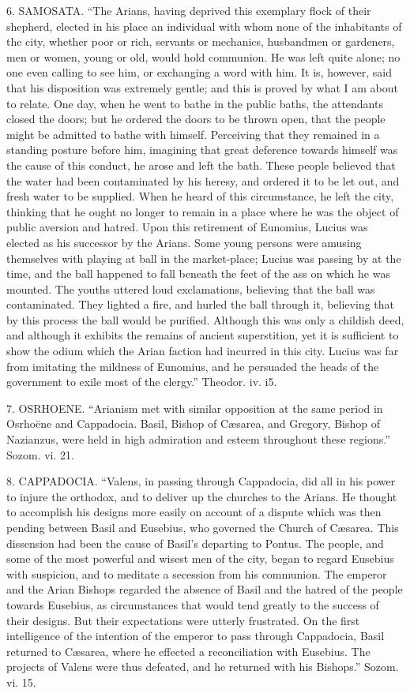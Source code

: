 6. SAMOSATA. ``The Arians, having
deprived this exemplary flock of their shepherd, elected in his place
an individual with whom none of the inhabitants of the city, whether
poor or rich, servants or mechanics, husbandmen or gardeners, men or
women, young or old, would hold communion. He was left quite alone; no
one even calling to see him, or exchanging a word with him. It is,
however, said that his disposition was extremely gentle; and this is
proved by what I am about to relate. One day, when he went to bathe in
the public baths, the attendants closed the doors; but he ordered the
doors to be thrown open, that the people might be admitted to bathe
with himself. Perceiving that they remained in a standing posture
before him, imagining that great deference towards himself was the
cause of this conduct, he arose and left the bath. These people
believed that the water had been contaminated by his heresy, and
ordered it to be let out, and fresh water to be supplied. When he
heard of this circumstance, he left the city, thinking that he ought
no longer to remain in a place where he was the object of public
aversion and hatred. Upon this retirement of Eunomius, Lucius was
elected as his successor by the Arians. Some young persons were
amusing themselves with playing at ball in the market-place; Lucius
was passing by at the time, and the ball happened to fall beneath the
feet of the ass on which he was mounted. The youths uttered loud
exclamations, believing that the ball was contaminated. They lighted a
fire, and hurled the ball through it, believing that by this process
the ball would be purified. Although this was only a childish deed,
and although it exhibits the remains of ancient superstition, yet it
is sufficient to show the odium which the Arian faction had incurred
in this city. Lucius was far from imitating the mildness of Eunomius,
and he persuaded the heads of the government to exile most of the
clergy.'' Theodor. iv. i5.

7. OSRHOENE. ``Arianism met with similar
opposition at the same period in Osrhoëne and Cappadocia.
Basil, Bishop of Cæsarea, and Gregory, Bishop of Nazianzus, were held
in high admiration and esteem throughout these regions.'' Sozom.
vi. 21.

8. CAPPADOCIA. ``Valens, in passing
through Cappadocia, did all in his power to injure the orthodox, and
to deliver up the churches to the Arians. He thought to accomplish his
designs more easily on account of a dispute which was then pending
between Basil and Eusebius, who governed the Church of Cæsarea. This
dissension had been the cause of Basil's departing to Pontus. The
people, and some of the most powerful and wisest men of the city,
began to regard Eusebius with suspicion, and to meditate a secession
from his communion. The emperor and the Arian Bishops regarded the
absence of Basil and the hatred of the people towards Eusebius, as
circumstances that would tend greatly to the success of their designs.
But their expectations were utterly frustrated. On the first
intelligence of the intention of the emperor to pass through
Cappadocia, Basil returned to Cæsarea, where he effected a
reconciliation with Eusebius. The projects of Valens were thus
defeated, and he returned with his Bishops.'' Sozom. vi. 15.

